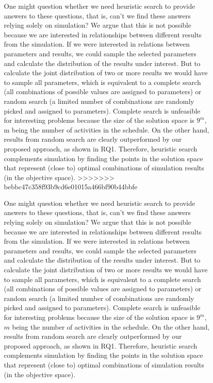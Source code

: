 \documentclass[conference]{IEEEtran}
\begin{document}
\begin{figure}
One might question whether we need heuristic search to provide answers to these questions, that is, can't we find these answers relying solely on simulation? We argue that this is not possible because we are interested in relationships between different results from the simulation. If we were interested in relations between parameters and results, we could sample the selected parameters and calculate the distribution of the results under interest. But to calculate the joint distribution of two or more results we would have to sample all parameters, which is equivalent to a complete search (all combinations of possible values are assigned to parameters) or random search (a limited number of combinations are randomly picked and assigned to parameters). Complete search is unfeasible for interesting problems because the size of the solution space is $9^m$, m being the number of activities in the schedule. On the other hand, results from random search are clearly outperformed by our proposed approach, as shown in RQ1. Therefore, heuristic search complements simulation by finding the points in the solution space that represent (close to) optimal combinations of simulation results (in the objective space).
>>>>>>> bebbc47c358f93b9cd6e01015a466bf90b44bbfe

One might question whether we need heuristic search to provide answers to these questions, that is, can't we find these answers relying solely on simulation? We argue that this is not possible because we are interested in relationships between different results from the simulation. If we were interested in relations between parameters and results, we could sample the selected parameters and calculate the distribution of the results under interest. But to calculate the joint distribution of two or more results we would have to sample all parameters, which is equivalent to a complete search (all combinations of possible values are assigned to parameters) or random search (a limited number of combinations are randomly picked and assigned to parameters). Complete search is unfeasible for interesting problems because the size of the solution space is $9^m$, $m$ being the number of activities in the schedule. On the other hand, results from random search are clearly outperformed by our proposed approach, as shown in RQ1. Therefore, heuristic search complements simulation by finding the points in the solution space that represent (close to) optimal combinations of simulation results (in the objective space).


\end{figure}
\end{document}
